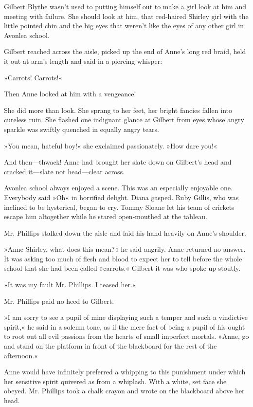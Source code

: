 Gilbert Blythe wasn’t used to putting himself out to make a girl look at him and meeting with failure. She should look at him, that red-haired Shirley girl with the little pointed chin and the big eyes that weren’t like the eyes of any other girl in Avonlea school.

Gilbert reached across the aisle, picked up the end of Anne’s long red braid, held it out at arm’s length and said in a piercing whisper:

»Carrots! Carrots!«

Then Anne looked at him with a vengeance!

She did more than look. She sprang to her feet, her bright fancies fallen into cureless ruin. She flashed one indignant glance at Gilbert from eyes whose angry sparkle was swiftly quenched in equally angry tears.

»You mean, hateful boy!« she exclaimed passionately. »How dare you!«

And then—thwack! Anne had brought her slate down on Gilbert’s head and cracked it—slate not head—clear across.

Avonlea school always enjoyed a scene. This was an especially enjoyable one. Everybody said »Oh« in horrified delight. Diana gasped. Ruby Gillis, who was inclined to be hysterical, began to cry. Tommy Sloane let his team of crickets escape him altogether while he stared open-mouthed at the tableau.

Mr. Phillips stalked down the aisle and laid his hand heavily on Anne’s shoulder.

»Anne Shirley, what does this mean?« he said angrily. Anne returned no answer. It was asking too much of flesh and blood to expect her to tell before the whole school that she had been called »carrots.« Gilbert it was who spoke up stoutly.

»It was my fault Mr. Phillips. I teased her.«

Mr. Phillips paid no heed to Gilbert.

»I am sorry to see a pupil of mine displaying such a temper and such a vindictive spirit,« he said in a solemn tone, as if the mere fact of being a pupil of his ought to root out all evil passions from the hearts of small imperfect mortals. »Anne, go and stand on the platform in front of the blackboard for the rest of the afternoon.«

Anne would have infinitely preferred a whipping to this punishment under which her sensitive spirit quivered as from a whiplash. With a white, set face she obeyed. Mr. Phillips took a chalk crayon and wrote on the blackboard above her head.

